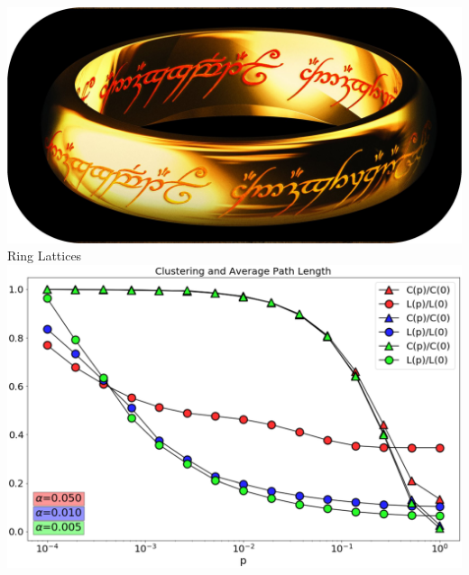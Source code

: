 \documentclass[serif,mathserif]{beamer}
\begin{document}
\begin{frame}{\includegraphics[height=0.06\textheight]{ring-of-power.eps}\hspace{0.25cm} Ring Lattices}
    \centering
    \includegraphics[height=0.85\textheight]{small-world.eps}
\end{frame}
\end{document}
